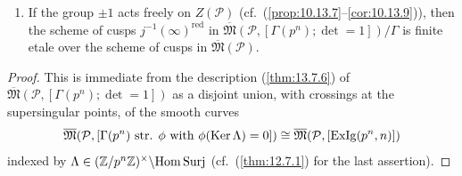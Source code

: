 \begin{kthm}
\begin{enumerate}[label=(\arabic*), leftmargin=2.4em]
\[
\overline{\mathfrak{M}}(\mathcal{P}, [\mathrm{ExIg}(p^n, n)])/\Gamma \cap \mathrm{Fix}^\times(\Lambda) .
\]
\item If the group $\pm 1$ acts freely on $Z(\mathcal{P})$ (cf.\ (\ref{prop:10.13.7}--\ref{cor:10.13.9})), then the scheme of cusps $j^{-1}(\infty)^{\mathrm{red}}$ in $\overline{\mathfrak{M}}(\mathcal{P}, [\Gamma(p^n); \det = 1])/\Gamma$ is finite etale over the scheme of cusps in $\overline{\mathfrak{M}}(\mathcal{P})$.
\end{enumerate}
\end{kthm}

\begin{proof}
This is immediate from the description (\ref{thm:13.7.6}) of $\overline{\mathfrak{M}}(\mathcal{P}, [\Gamma(p^n); \det = 1])$ as a disjoint union, with crossings at the supersingular points, of the smooth curves
\[
\overline{\mathfrak{M}}(\mathcal{P}, [\Gamma(p^n)\text{ str. } \phi \text{ with } \phi(\operatorname{Ker} \Lambda) = 0]) \cong \overline{\mathfrak{M}}(\mathcal{P}, [\mathrm{ExIg}(p^n, n)])
\]
indexed by $\Lambda \in (\mathbb{Z}/p^n\mathbb{Z})^\times \backslash \mathrm{Hom\,Surj}$ (cf.\ (\ref{thm:12.7.1}) for the last assertion).
\end{proof}
